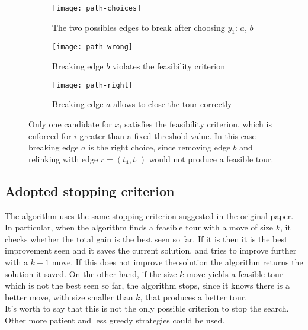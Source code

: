 \begin{figure}[h]
	\centering
	\begin{subfigure}[c]{0.31\textwidth}
		\texttt{[image: path-choices]}
		\caption{The two possibles edges to break after choosing $y_1$: $a$, $b$}
	\end{subfigure}
	\begin{subfigure}[c]{0.31\textwidth}
		\texttt{[image: path-wrong]}
		\caption{Breaking edge $b$ violates the feasibility criterion}
	\end{subfigure}
	\begin{subfigure}[c]{0.31\textwidth}
		\texttt{[image: path-right]}
		\caption{Breaking edge $a$ allows to close the tour correctly}
	\end{subfigure}
	\caption{Only one candidate for $x_i$ satisfies the feasibility criterion, which is enforced for $i$ greater than a fixed threshold value. In this case breaking edge $a$ is the right choice, since removing edge $b$ and relinking with edge $r=(t_4,t_1)$ would not produce a feasible tour.}
	\label{fig:feasibility-moves}
\end{figure}

\subsection{Adopted stopping criterion}
The algorithm uses the same stopping criterion suggested in the original paper. In particular, when the algorithm finds a feasible tour with a move of size $k$, it checks whether the total gain is the best seen so far. If it is then it is the best improvement seen and it saves the current solution, and tries to improve further with a $k+1$ move. If this does not improve the solution the algorithm returns the solution it saved. On the other hand, if the size $k$ move yields a feasible tour which is not the best seen so far, the algorithm stops, since it knows there is a better move, with size smaller than $k$, that produces a better tour.\\
It's worth to say that this is not the only possible criterion to stop the search. Other more patient and less greedy strategies could be used.

